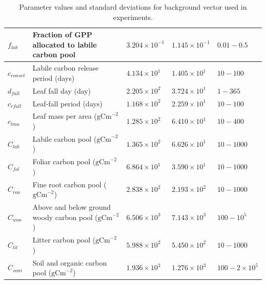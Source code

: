 \documentclass[review]{elsarticle}
\begin{document}
\begin{table}[ht]
\begin{center}
\begin{tabular}{| l | l | l | l | l |}
$f_{lab}$ & Fraction of GPP allocated to labile carbon pool & $3.204\times 10^{-1}$ & $1.145\times 10^{-1}$ & $0.01 - 0.5$ \\ \hline
$c_{ronset}$ & Labile carbon release period (days) & $4.134\times 10^{1}$ & $1.405\times 10^{1}$ & $10 - 100$ \\ \hline
$d_{fall}$ & Leaf fall day (day) & $2.205\times 10^{2}$ & $3.724\times 10^{1}$ & $1 - 365$ \\ \hline
$c_{rfall}$ & Leaf-fall period (days) & $1.168\times 10^{2}$ & $2.259\times 10^{1}$ & $10 - 100$ \\ \hline
$c_{lma}$ & Leaf mass per area ($\text{gCm}^{-2}$) & $1.285\times 10^{2}$ & $6.410\times 10^{1}$ & $10 - 400$ \\ \hline
$C_{lab}$ & Labile carbon pool ($\text{gCm}^{-2}$) & $1.365\times 10^{2}$ & $6.626\times 10^{1}$ & $10 - 1000$ \\ \hline
$C_{fol}$ & Foliar carbon pool ($\text{gCm}^{-2}$) & $6.864\times 10^{1}$ & $3.590\times 10^{1}$ & $10 - 1000$ \\ \hline
$C_{roo}$ & Fine root carbon pool ($\text{gCm}^{-2}$) & $2.838\times 10^{2}$ & $2.193\times 10^{2}$ & $10 - 1000$ \\ \hline
$C_{woo}$ & Above and below ground woody carbon pool ($\text{gCm}^{-2}$) & $6.506\times 10^{3}$ & $7.143\times 10^{3}$ & $100 - 10^{5}$ \\ \hline
$C_{lit}$ & Litter carbon pool ($\text{gCm}^{-2}$) & $5.988\times 10^{2}$ & $5.450\times 10^{2}$ & $10 - 1000$ \\ \hline
$C_{som}$ & Soil and organic carbon pool ($\text{gCm}^{-2}$) & $1.936\times 10^{3}$ & $1.276\times 10^{3}$ & $100 - 2 \times 10^{5}$  \\ \hline
	\end{tabular}
	\caption{Parameter values and standard deviations for background vector used in experiments.}
	\label{table:xbvars}
\end{center} 
\end{table}
\end{document}
